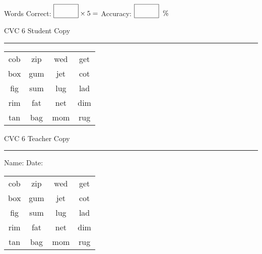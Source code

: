 \documentclass{memoir}
\begin{document}
\normalsize

Words Correct: $\fbox{\phantom{\huge 100}} \times 5 = $ Accuracy: $\fbox{\phantom{\huge 100}}\;\; \%$ 

\vfill

\newpage


\footnotesize \noindent
CVC 6 \hfill Student Copy
\smallskip
\hrule

\huge

\setlength{\tabcolsep}{14pt}
\def\arraystretch{2}

{\selectfont


\begin{vplace}[0.5]
\begin{center}
\begin{tabular}{cccc}
cob & zip & wed & get \\
box & gum  & jet & cot \\
fig & sum & lug & lad \\
rim & fat & net & dim \\
tan & bag & mom & rug \\
\end{tabular}
\end{center}
\end{vplace}

}

\newpage

\footnotesize \noindent
CVC 6 \hfill Teacher Copy
\smallskip
\hrule

\normalsize

\vfill

\noindent
Name: \underline{\hspace{1.75in}} \hfill Date: \underline{\hspace{1in}}

\huge

{\selectfont


\begin{vplace}[0.5]
\begin{center}
\begin{tabular}{cccc}
cob & zip & wed & get \\
box & gum  & jet & cot \\
fig & sum & lug & lad \\
rim & fat & net & dim \\
tan & bag & mom & rug \\
\end{tabular}
\end{center}
\end{vplace}



}
\end{document}
